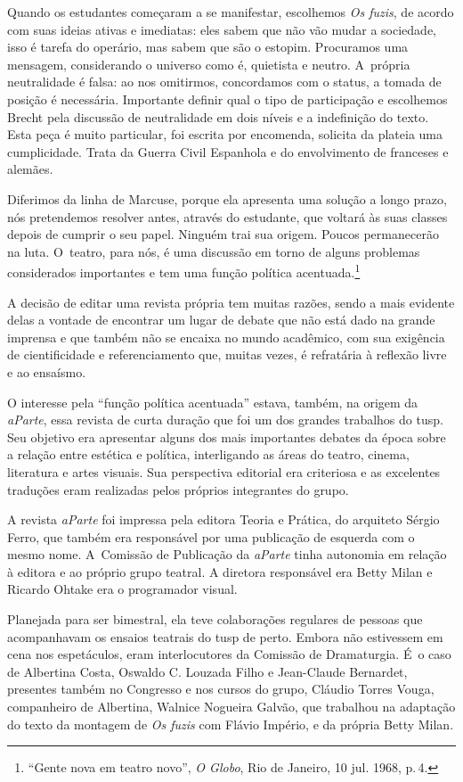 {Quando os estudantes começaram a se manifestar, escolhemos {\it Os
fuzis}, de acordo com suas ideias ativas e imediatas: eles sabem que não
vão mudar a sociedade, isso é tarefa do operário, mas sabem que são o
estopim. Procuramos uma mensagem, considerando o universo como é,
quietista e neutro. A~própria neutralidade é falsa: ao nos omitirmos,
concordamos com o status, a tomada de posição é necessária. Importante
definir qual o tipo de participação e escolhemos Brecht pela discussão
de neutralidade em dois níveis e a indefinição do texto. Esta peça é
muito particular, foi escrita por encomenda, solicita da plateia uma
cumplicidade. Trata da Guerra Civil Espanhola e do envolvimento de
franceses e alemães.

Diferimos da linha de Marcuse, porque ela apresenta uma solução a longo
prazo, nós pretendemos resolver antes, através do estudante, que voltará
às suas classes depois de cumprir o seu papel. Ninguém trai sua origem.
Poucos permanecerão na luta. O~teatro, para nós, é uma discussão em
torno de alguns problemas considerados importantes e tem uma função
política acentuada.\footnote{“Gente nova em teatro novo”, {\it O
  Globo}, Rio de Janeiro, 10 jul. 1968, p.\,4.}
\stopblockquote

A decisão de editar uma revista própria tem muitas razões, sendo a mais
evidente delas a vontade de encontrar um lugar de debate que não está
dado na grande imprensa e que também não se encaixa no mundo acadêmico,
com sua exigência de cientificidade e referenciamento que, muitas vezes, é
refratária à reflexão livre e ao ensaísmo.

O interesse pela “função política acentuada” estava, também, na origem
da {\it aParte}, essa revista de curta duração que foi um dos grandes
trabalhos do {\sc tusp}. Seu objetivo era apresentar alguns dos mais
importantes debates da época sobre a relação entre estética e política,
interligando as áreas do teatro, cinema, literatura e artes visuais. Sua
perspectiva editorial era criteriosa e as excelentes traduções eram
realizadas pelos próprios integrantes do grupo.

A revista {\it aParte} foi impressa pela editora Teoria e Prática, do
arquiteto Sérgio Ferro, que também era responsável por uma publicação de
esquerda com o mesmo nome. A~Comissão de Publicação da {\it aParte}
tinha autonomia em relação à editora e ao próprio grupo teatral. A
diretora responsável era Betty Milan e Ricardo
Ohtake era o programador visual.

Planejada para ser bimestral, ela teve colaborações regulares de pessoas
que acompanhavam os ensaios teatrais do {\sc tusp} de perto. Embora não
estivessem em cena nos espetáculos, eram interlocutores da Comissão de
Dramaturgia. É~o caso de Albertina Costa, Oswaldo C. Louzada Filho e
Jean-Claude Bernardet, presentes também no Congresso e nos cursos do
grupo, Cláudio Torres Vouga, companheiro de Albertina, Walnice Nogueira
Galvão, que trabalhou na adaptação do texto da montagem de {\it Os
fuzis} com Flávio Império, e da própria Betty Milan.

}
